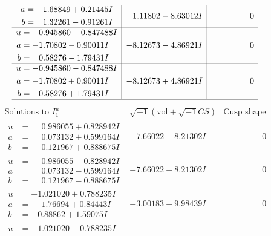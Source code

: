 \documentclass[1p]{elsarticle_modified}
\theoremstyle{definition}
\newcommand{\I}{\sqrt{-1}}
\begin{document}
$$\begin{array}{c|c|c}
\begin{aligned}
a &= -1.68849 + 0.21445 I \\
b &= \phantom{-}1.32261 - 0.91261 I\end{aligned}
 & \phantom{-}1.11802 - 8.63012 I & \phantom{-0.000000 } 0 \\ \hline\begin{aligned}
u &= -0.945860 + 0.847488 I \\
a &= -1.70802 - 0.90011 I \\
b &= \phantom{-}0.58276 - 1.79431 I\end{aligned}
 & -8.12673 - 4.86921 I & \phantom{-0.000000 } 0 \\ \hline\begin{aligned}
u &= -0.945860 - 0.847488 I \\
a &= -1.70802 + 0.90011 I \\
b &= \phantom{-}0.58276 + 1.79431 I\end{aligned}
 & -8.12673 + 4.86921 I & \phantom{-0.000000 } 0\\
 \hline 
 \end{array}$$\newpage$$\begin{array}{c|c|c}  
\text{Solutions to }I^u_{1}& \I (\text{vol} + \sqrt{-1}CS) & \text{Cusp shape}\\
 \hline 
\begin{aligned}
u &= \phantom{-}0.986055 + 0.828942 I \\
a &= \phantom{-}0.073132 + 0.599164 I \\
b &= \phantom{-}0.121967 + 0.888675 I\end{aligned}
 & -7.66022 + 8.21302 I & \phantom{-0.000000 } 0 \\ \hline\begin{aligned}
u &= \phantom{-}0.986055 - 0.828942 I \\
a &= \phantom{-}0.073132 - 0.599164 I \\
b &= \phantom{-}0.121967 - 0.888675 I\end{aligned}
 & -7.66022 - 8.21302 I & \phantom{-0.000000 } 0 \\ \hline\begin{aligned}
u &= -1.021020 + 0.788235 I \\
a &= \phantom{-}1.76694 + 0.84443 I \\
b &= -0.88862 + 1.59075 I\end{aligned}
 & -3.00183 - 9.98439 I & \phantom{-0.000000 } 0 \\ \hline\begin{aligned}
u &= -1.021020 - 0.788235 I \\

\end{aligned}
\end{array}$$
\end{document}
